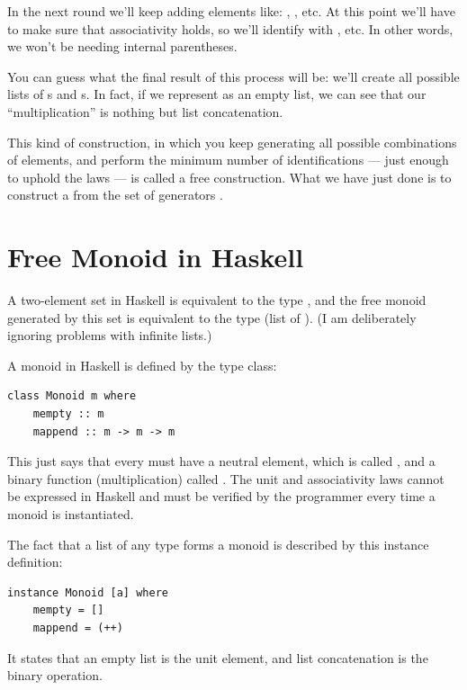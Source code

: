 \noindent
In the next round we'll keep adding elements like:
, , etc. At this point we'll
have to make sure that associativity holds, so we'll identify
 with , etc. In other words,
we won't be needing internal parentheses.

You can guess what the final result of this process will be: we'll
create all possible lists of s and s. In fact, if we
represent  as an empty list, we can see that our
``multiplication'' is nothing but list concatenation.

This kind of construction, in which you keep generating all possible
combinations of elements, and perform the minimum number of
identifications --- just enough to uphold the laws --- is called a free
construction. What we have just done is to construct a  from the set of generators .

\section{Free Monoid in Haskell}\label{free-monoid-in-haskell}

A two-element set in Haskell is equivalent to the type ,
and the free monoid generated by this set is equivalent to the type
\code{{[}Bool{]}} (list of ). (I am deliberately ignoring
problems with infinite lists.)

A monoid in Haskell is defined by the type class:

\begin{Verbatim}[commandchars=\\\{\}]
class Monoid m where
    mempty :: m
    mappend :: m -> m -> m
\end{Verbatim}
This just says that every  must have a neutral element,
which is called , and a binary function (multiplication)
called . The unit and associativity laws cannot be
expressed in Haskell and must be verified by the programmer every time a
monoid is instantiated.

The fact that a list of any type forms a monoid is described by this
instance definition:

\begin{Verbatim}[commandchars=\\\{\}]
instance Monoid [a] where
    mempty = []
    mappend = (++)
\end{Verbatim}
It states that an empty list \code{{[}{]}} is the unit element, and
list concatenation \code{(++)} is the binary operation.

